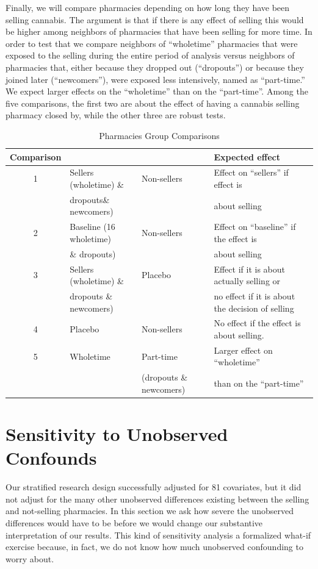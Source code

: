 \documentclass[11pt]{article}
\begin{document}
Finally, we will compare pharmacies depending on how long they have been selling  cannabis. The argument is that if there is any effect of selling this would be higher among neighbors of pharmacies that have been selling for more time. In order to test that we compare neighbors of ``wholetime'' pharmacies that were exposed to the selling during the entire period of analysis versus neighbors of pharmacies that, either because they dropped out (``dropouts'') or because they joined later (``newcomers''), were exposed less intensively, named as ``part-time.'' We expect larger effects on the ``wholetime'' than on the ``part-time''. Among the five comparisons, the first two are about the effect of having a cannabis  selling pharmacy closed by, while the other three are robust tests.

\begin{table}[h]
        \centering
        \footnotesize
        \caption{Pharmacies Group Comparisons}
    \label{tab:comparisons}
    \begin{tabular}{clll}
\hline
Comparison    &		&		&	Expected effect	\\ \hline
1	      &	Sellers (wholetime) \&	&	Non-sellers	&	Effect on ``sellers'' if effect is	\\
	      &	dropouts\& newcomers)	&		&	about selling	\\
2	      &	Baseline (16 wholetime)	&	Non-sellers	&	Effect on ``baseline'' if the effect is 	\\
	      &	\& dropouts)	&		&	about selling	\\
3	      &	Sellers (wholetime) \&	&	Placebo	&	Effect if it is about actually selling or 	\\
	      &	dropouts \& newcomers)	&		&  no effect if it is about the decision of selling	\\
4	      &	Placebo 	&	Non-sellers	&	No effect if the effect is about selling. 	\\
5	      &	Wholetime	&	Part-time	&	Larger effect on ``wholetime'' 	\\
	      &		&	 (dropouts \& newcomers)	&	than on the ``part-time''	\\ \hline
\end{tabular}
\end{table}

\section{Sensitivity to Unobserved Confounds} \label{sec:sensitivity}
Our stratified research design successfully adjusted for 81 covariates, but it did not adjust for the many other unobserved differences existing between the selling and not-selling pharmacies. In this section we ask how severe the unobserved differences would have to be before we would change our substantive interpretation of our results. This kind of sensitivity analysis a formalized what-if exercise because, in fact, we do not know how much unobserved confounding to worry about.
\end{document}
